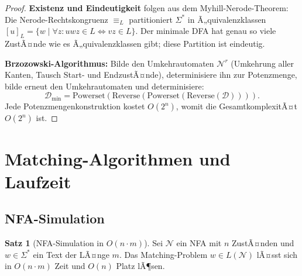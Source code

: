 ﻿\documentclass[a4paper,12pt]{article}
\theoremstyle{definition}
\newtheorem{satz}{Satz}
\begin{document}
\begin{proof}
	\textbf{Existenz und Eindeutigkeit} folgen aus dem Myhill-Nerode-Theorem:
	Die Nerode-Rechtskongruenz $\equiv_L$ partitioniert $\Sigma^*$ in
	Ã„quivalenzklassen $[u]_L = \{w \mid \forall z: uwz \in L \Leftrightarrow vz \in L\}$.
	Der minimale DFA hat genau so viele ZustÃ¤nde wie es Ã„quivalenzklassen gibt;
	diese Partition ist eindeutig.

	\textbf{Brzozowski-Algorithmus:} Bilde den Umkehrautomaten $\mathcal{N}^r$
	(Umkehrung aller Kanten, Tausch Start- und EndzustÃ¤nde), determinisiere ihn
	zur Potenzmenge, bilde erneut den Umkehrautomaten und determinisiere:
	\[
		\mathcal{D}_{\min} = \mathrm{Powerset}\!\left(\mathrm{Reverse}\!\left(
		\mathrm{Powerset}(\mathrm{Reverse}(\mathcal{D}))\right)\right).
	\]
	Jede Potenzmengenkonstruktion kostet $O(2^n)$, womit die GesamtkomplexitÃ¤t
	$O(2^n)$ ist. \qedhere
\end{proof}

\section{Matching-Algorithmen und Laufzeit}

\subsection{NFA-Simulation}

\begin{satz}[NFA-Simulation in $O(n \cdot m)$]
	\label{satz:nfa-sim}
	Sei $\mathcal{N}$ ein NFA mit $n$ ZustÃ¤nden und $w \in \Sigma^*$ ein Text der
	LÃ¤nge $m$. Das Matching-Problem $w \in L(\mathcal{N})$ lÃ¤sst sich in
	$O(n \cdot m)$ Zeit und $O(n)$ Platz lÃ¶sen.
\end{satz}
\end{document}
